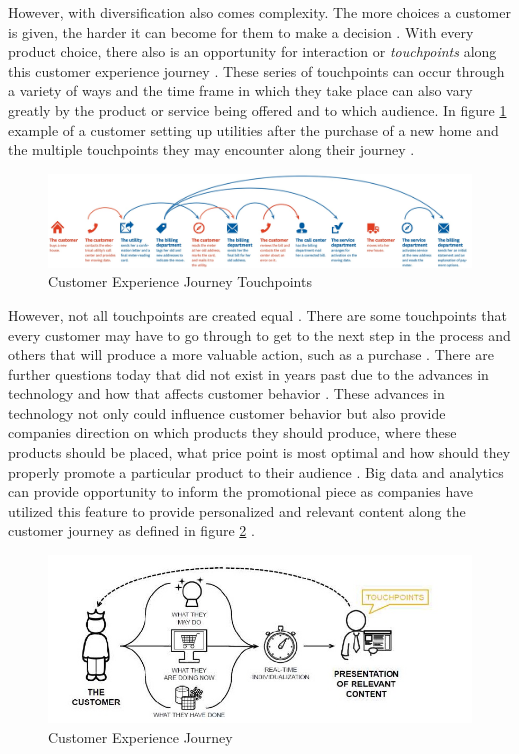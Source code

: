 \documentclass[sigconf]{acmart}
\begin{document}
However, with diversification also comes complexity. The more choices a customer is given, the harder it can become for them to make a decision \cite{Stoicescu2015}. With every product choice, there also is an opportunity for interaction or \textit{touchpoints} along this customer experience journey \cite{Meyer2007}. These series of touchpoints can occur through a variety of ways and the time frame in which they take place can also vary greatly by the product or service being offered and to which audience. In figure \ref{f:Customer Experience Journey}  example of a customer setting up utilities after the purchase of a new home and the multiple touchpoints they may encounter along their journey \cite{Rawson2013}.

\begin{figure}[ht!]
  \centering\includegraphics[width=\columnwidth]{example.jpg}
  \caption{Customer Experience Journey Touchpoints}\label{f:Customer Experience Journey}
\end{figure}

However, not all touchpoints are created equal \cite{Meyer2007}. There are some touchpoints that every customer may have to go through to get to the next step in the process and others that will produce a more valuable action, such as a purchase \cite{Meyer2007}. There are further questions today that did not exist in years past due to the advances in technology and how that affects customer behavior \cite{Kannan2017}. These advances in technology not only could influence customer behavior but also provide companies direction on which products they should produce, where these products should be placed, what price point is most optimal and how should they properly promote a particular product to their audience \cite{Kannan2017}. Big data and analytics can provide opportunity to inform the promotional piece as companies have utilized this feature to provide personalized and relevant content along  the customer journey as defined in figure \ref{f:Customer Journey} \cite{Stoicescu2015}. 

\begin{figure}[ht!]
  \centering\includegraphics[width=\columnwidth]{customerjourney.jpg}
  \caption{Customer Experience Journey}\label{f:Customer Journey}
\end{figure}
\end{document}
